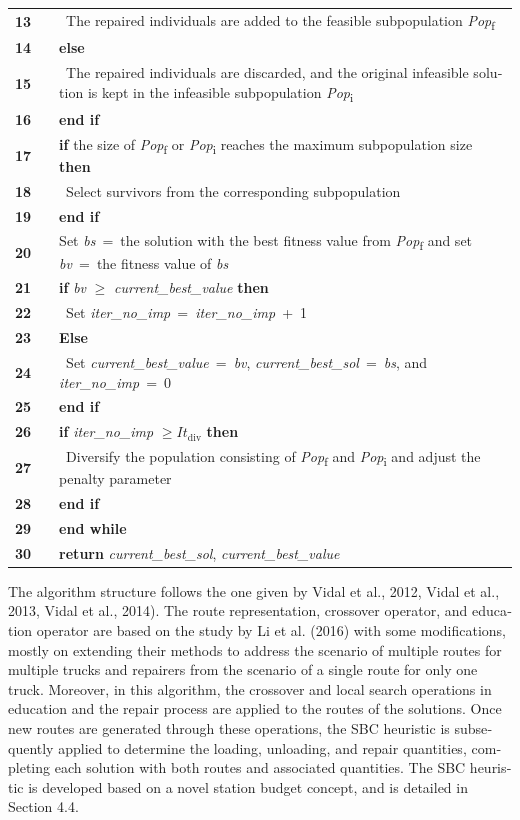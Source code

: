 \documentclass[
  english,
]{article}
\begin{document}
\begin{otherlanguage}{english}
{\begin{longtable}[]{@{}lll@{}}
\textbf{13} & & ~The repaired individuals are added to the feasible subpopulation
\emph{Pop}\textsubscript{f} \\
\textbf{14} & & \textbf{else} \\
\textbf{15} & & ~The repaired individuals are discarded, and the original infeasible solution is
kept in the infeasible subpopulation \emph{Pop}\textsubscript{i} \\
\textbf{16} & & \textbf{end if} \\
\textbf{17} & & \textbf{if} the size of \emph{Pop}\textsubscript{f} or \emph{Pop}\textsubscript{i}
reaches the maximum subpopulation size \textbf{then} \\
\textbf{18} & & ~Select survivors from the corresponding subpopulation \\
\textbf{19} & & \textbf{end if} \\
\textbf{20} & & Set \emph{bs}~=~the solution with the best fitness value from
\emph{Pop}\textsubscript{f} and set \emph{bv}~=~the fitness value of \emph{bs} \\
\textbf{21} & & \textbf{if} \emph{bv} \(\geq\) \emph{current\_best\_value} \textbf{then} \\
\textbf{22} & & ~Set \emph{iter\_no\_imp}~=~\emph{iter\_no\_imp}~+~1 \\
\textbf{23} & & \textbf{Else} \\
\textbf{24} & & ~Set \emph{current\_best\_value}~=~\emph{bv}, \emph{current\_best\_sol}~=~\emph{bs},
and \emph{iter\_no\_imp}~=~0 \\
\textbf{25} & & \textbf{end if} \\
\textbf{26} & & \textbf{if} \emph{iter\_no\_imp} \(\geq It_{\text{div}}\) \textbf{then} \\
\textbf{27} & & ~Diversify the population consisting of \emph{Pop}\textsubscript{f} and
\emph{Pop}\textsubscript{i} and adjust the penalty parameter \\
\textbf{28} & & \textbf{end if} \\
\textbf{29} & & \textbf{end while} \\
\textbf{30} & & \textbf{return} \emph{current\_best\_sol}, \emph{current\_best\_value} \\
\end{longtable}
}

The algorithm structure follows the one given by Vidal et al., 2012, Vidal et al., 2013, Vidal et
al., 2014). The route representation, crossover operator, and education operator are based on the
study by Li et al. (2016) with some modifications, mostly on extending their methods to address the
scenario of multiple routes for multiple trucks and repairers from the scenario of a single route
for only one truck. Moreover, in this algorithm, the crossover and local search operations in
education and the repair process are applied to the routes of the solutions. Once new routes are
generated through these operations, the SBC heuristic is subsequently applied to determine the
loading, unloading, and repair quantities, completing each solution with both routes and associated
quantities. The SBC heuristic is developed based on a novel station budget concept, and is detailed
in Section 4.4.


\end{otherlanguage}
\end{document}
